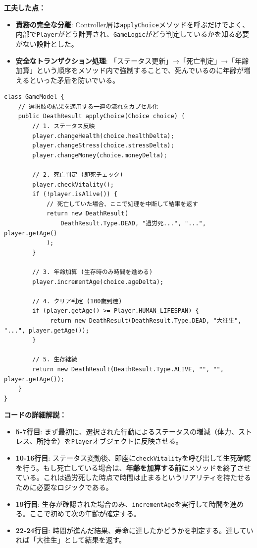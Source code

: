 \documentclass[a4paper,11pt]{jsarticle}
\begin{document}
\textbf{工夫した点：}
\begin{itemize}
    \item \textbf{責務の完全な分離}: 
    Controller層は\texttt{applyChoice}メソッドを呼ぶだけでよく、内部で\texttt{Player}がどう計算され、\texttt{GameLogic}がどう判定しているかを知る必要がない設計とした。
    \item \textbf{安全なトランザクション処理}: 
    「ステータス更新」→「死亡判定」→「年齢加算」という順序をメソッド内で強制することで、死んでいるのに年齢が増えるといった矛盾を防いでいる。
\end{itemize}

\begin{lstlisting}[caption=GameModel.java（ファサードの実装詳細）, label=code:gamemodel_detail]
class GameModel {
    // 選択肢の結果を適用する一連の流れをカプセル化
    public DeathResult applyChoice(Choice choice) {
        // 1. ステータス反映
        player.changeHealth(choice.healthDelta);
        player.changeStress(choice.stressDelta);
        player.changeMoney(choice.moneyDelta);
        
        // 2. 死亡判定 (即死チェック)
        player.checkVitality();
        if (!player.isAlive()) {
            // 死亡していた場合、ここで処理を中断して結果を返す
            return new DeathResult(
                DeathResult.Type.DEAD, "過労死...", "...", player.getAge()
            );
        }

        // 3. 年齢加算 (生存時のみ時間を進める)
        player.incrementAge(choice.ageDelta);
        
        // 4. クリア判定 (100歳到達)
        if (player.getAge() >= Player.HUMAN_LIFESPAN) {
             return new DeathResult(DeathResult.Type.DEAD, "大往生", "...", player.getAge());
        }

        // 5. 生存継続
        return new DeathResult(DeathResult.Type.ALIVE, "", "", player.getAge());
    }
}
\end{lstlisting}

\textbf{コードの詳細解説：}
\begin{itemize}
    \item \textbf{5-7行目}: まず最初に、選択された行動によるステータスの増減（体力、ストレス、所持金）を\texttt{Player}オブジェクトに反映させる。
    \item \textbf{10-16行目}: ステータス変動後、即座に\texttt{checkVitality}を呼び出して生死確認を行う。もし死亡している場合は、\textbf{年齢を加算する前に}メソッドを終了させている。これは過労死した時点で時間は止まるというリアリティを持たせるために必要なロジックである。
    \item \textbf{19行目}: 生存が確認された場合のみ、\texttt{incrementAge}を実行して時間を進める。ここで初めて次の年齢が確定する。
    \item \textbf{22-24行目}: 時間が進んだ結果、寿命に達したかどうかを判定する。達していれば「大往生」として結果を返す。
\end{itemize}
\end{document}
